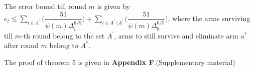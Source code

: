 \begin{theorem}
The error bound till round $m$ is given by $e_{t}\leq \sum_{i\in A^{'}}\bigg(\dfrac{51}{\psi(m)\Delta_{i}^{6/5}} \bigg)+\sum_{i\in A^{''}\setminus A^{'}}\bigg(\dfrac{51}{\psi(m)\Delta_{b}^{6/5}} \bigg)$, where the arms surviving till $m$-th round belong to the set $A^{'}$, arms to still survive and eliminate arm $a^{*}$ after round $m$ belong to $A^{''}$.
\end{theorem}
The proof of theorem 5 is given in \textbf{Appendix F}.(Supplementary material)
